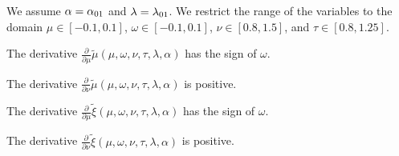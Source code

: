 \documentclass{article}
\newcommand\munn{{\tilde \mu}}
\newcommand\xinn{{\tilde \xi}}
\begin{document}
\begin{lemma}
\label{proof:mapDerivatives}
We assume $\alpha = \alpha_{\rm 01}$ and $\lambda=\lambda_{\rm 01}$.
We restrict the range of the variables to the domain
$\mu \in [-0.1,0.1]$,
$\omega \in [-0.1,0.1]$,
$\nu \in [0.8,1.5]$, and
$\tau \in [0.8,1.25]$.

The derivative $\frac{\partial }{\partial \mu}
\munn(\mu,\omega,\nu,\tau,\lambda ,\alpha )$
has the sign of $\omega$.

The derivative $\frac{\partial }{\partial \nu}
 \munn(\mu,\omega,\nu,\tau,\lambda ,\alpha )$
is positive.

The derivative $\frac{\partial }{\partial \mu } \xinn(\mu,\omega,\nu,\tau,\lambda ,\alpha )$
has the sign of $\omega$.

The derivative 
$\frac{\partial }{\partial \nu } \xinn(\mu,\omega,\nu,\tau,\lambda ,\alpha )$
is positive.
\end{lemma}
\end{document}

